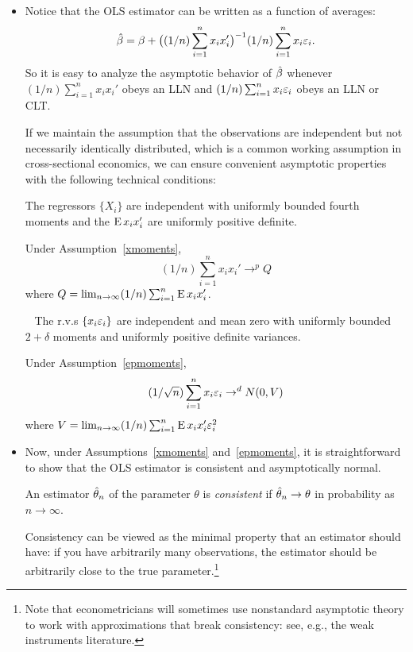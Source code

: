 \begin{itemize}[leftmargin=0pt]
\item Notice that the OLS estimator can be written as a function of
  averages:
  \begin{equation*}
    \hat{\beta} = \beta + \big( (1/n) \sum_{i=1}^n x_i x_i' \big)^{-1}
    (1/n) \sum_{i=1}^n x_i \varepsilon_i.
  \end{equation*}
  So it is easy to analyze the asymptotic behavior of $\hat{\beta}$ whenever
  $(1/n) \sum_{i=1}^n x_i x_i'$ obeys an LLN and $(1/n) \sum_{i=1}^n x_i \varepsilon_i$
  obeys an LLN or CLT.

  If we maintain the assumption that the observations are independent
  but not necessarily identically distributed, which is a common
  working assumption in cross-sectional economics, we can ensure
  convenient asymptotic properties with the following technical
  conditions:
  \begin{asmp}\label{xmoments}
    The regressors $\{X_i\}$ are independent with uniformly bounded
    fourth moments and the $\operatorname{E} x_i x_i'$ are uniformly positive
    definite.
  \end{asmp}
  Under Assumption~\ref{xmoments},
  \begin{equation*}
    (1/n) \sum_{i=1}^n x_i x_i' \to^p Q
  \end{equation*}
  where $Q = \lim_{n\to\infty} (1/n) \sum_{i=1}^n \operatorname{E} x_i x_i'$.

  \begin{asmp}~\label{epmoments}
    The r.v.s $\{x_i \varepsilon_i\}$ are independent and mean zero with
    uniformly bounded $2 + \delta$ moments and uniformly positive definite
    variances.
  \end{asmp}
  Under Assumption~\ref{epmoments},
  \begin{equation*}
    (1/\sqrt{n}) \sum_{i=1}^n x_i \varepsilon_i \to^d N(0, V)
  \end{equation*}
  where $V = \lim_{n\to\infty} (1/n) \sum_{i=1}^n \operatorname{E} x_i x_i' \varepsilon_i^2$

\item Now, under Assumptions~\ref{xmoments} and~\ref{epmoments}, it is
  straightforward to show that the OLS estimator is consistent and
  asymptotically normal.
  \begin{defn}
    An estimator $\hat{\theta}_n$ of the parameter $\theta$ is \emph{consistent} if
    $\hat{\theta}_n \to \theta$ in probability as $n \to \infty$.
  \end{defn}
  Consistency can be viewed as the minimal property that an estimator
  should have: if you have arbitrarily many observations, the
  estimator should be arbitrarily close to the true
  parameter.\footnote{Note that econometricians will sometimes use
    nonstandard asymptotic theory to work with approximations that
    break consistency: see, e.g., the weak instruments literature.}


\end{itemize}
